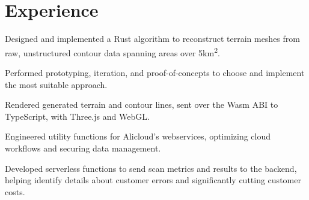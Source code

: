 \section{Experience}

\begin{resumeItem}
\begin{resumeList}
    \item Designed and implemented a Rust algorithm to reconstruct terrain meshes from raw, unstructured contour data spanning areas over 5km\textsuperscript{2}.
    \item Performed prototyping, iteration, and proof-of-concepts to choose and implement the most suitable approach.
    \item Rendered generated terrain and contour lines, sent over the Wasm ABI to TypeScript, with Three.js and WebGL.
\end{resumeList}
\end{resumeItem}

\begin{resumeItem}
\begin{resumeList}
    \item Engineered utility functions for Alicloud's webservices, optimizing cloud workflows and securing data management.
    \item Developed serverless functions to send scan metrics and results to the backend, helping identify details about customer errors and significantly cutting customer costs.
\end{resumeList}
\end{resumeItem}

